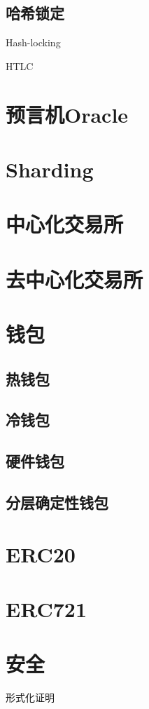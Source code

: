 \documentclass[UTF8]{ctexart}
\begin{document}
\subsection{哈希锁定}
Hash-locking

HTLC

\section{预言机Oracle}

\section{Sharding}

\section{中心化交易所}

\section{去中心化交易所}

\section{钱包}

\subsection{热钱包}

\subsection{冷钱包}

\subsection{硬件钱包}

\subsection{分层确定性钱包}

\section{ERC20}

\section{ERC721}

\section{安全}
形式化证明

\ifx\allfiles\undefined
\end{document}
